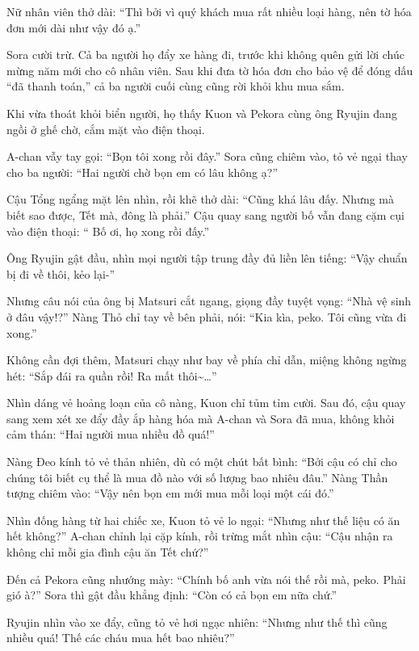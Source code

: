 \documentclass[../main.tex]{subfiles}
\begin{document}
Nữ nhân viên thở dài: ``Thì bởi vì quý khách mua rất nhiều loại hàng, nên tờ hóa đơn mới dài như vậy đó ạ.''

Sora cười trừ. Cả ba người họ đẩy xe hàng đi, trước khi không quên gửi lời chúc mừng năm mới cho cô nhân viên. Sau khi đưa tờ hóa đơn cho bảo vệ để đóng dấu ``đã thanh toán,'' cả ba người cuối cùng cũng rời khỏi khu mua sắm.

Khi vừa thoát khỏi biển người, họ thấy Kuon và Pekora cùng ông Ryujin đang ngồi ở ghế chờ, cắm mặt vào điện thoại.

A-chan vẫy tay gọi: ``Bọn tôi xong rồi đây.'' Sora cũng chiêm vào, tỏ vẻ ngại thay cho ba người: ``Hai người chờ bọn em có lâu không ạ?''

Cậu Tổng ngẩng mặt lên nhìn, rồi khẽ thở dài: ``Cũng khá lâu đấy. Nhưng mà biết sao được, Tết mà, đông là phải.'' Cậu quay sang người bố vẫn đang cặm cụi vào điện thoại: ``{\color{red} Bố ơi, họ xong rồi đấy.}''

Ông Ryujin gật đầu, nhìn mọi người tập trung đầy đủ liền lên tiếng: ``Vậy chuẩn bị đi về thôi, kẻo lại-''

Nhưng câu nói của ông bị Matsuri cắt ngang, giọng đầy tuyệt vọng: ``Nhà vệ sinh ở đâu vậy!?'' Nàng Thỏ chỉ tay về bên phải, nói: ``Kia kìa, peko. Tôi cũng vừa đi xong.''

Không cần đợi thêm, Matsuri chạy như bay về phía chỉ dẫn, miệng không ngừng hét: ``Sắp đái ra quần rồi! Ra mất thôi\~{}\dots''

Nhìn dáng vẻ hoảng loạn của cô nàng, Kuon chỉ tủm tỉm cười. Sau đó, cậu quay sang xem xét xe đẩy đầy ắp hàng hóa mà A-chan và Sora đã mua, không khỏi cảm thán: ``Hai người mua nhiều đồ quá!''

Nàng Đeo kính tỏ vẻ thản nhiên, dù có một chút bất bình: ``Bởi cậu có chỉ cho chúng tôi biết cụ thể là mua đồ nào với số lượng bao nhiêu đâu.'' Nàng Thần tượng chiêm vào: ``Vậy nên bọn em mới mua mỗi loại một cái đó.''

Nhìn đống hàng từ hai chiếc xe, Kuon tỏ vẻ lo ngại: ``Nhưng như thế liệu có ăn hết không?'' A-chan chỉnh lại cặp kính, rồi trừng mắt nhìn cậu: ``Cậu nhận ra không chỉ mỗi gia đình cậu ăn Tết chứ?''

Đến cả Pekora cũng nhướng mày: ``Chính bố anh vừa nói thế rồi mà, peko. Phải gió à?'' Sora thì gật đầu khẳng định: ``Còn có cả bọn em nữa chứ.''

Ryujin nhìn vào xe đẩy, cũng tỏ vẻ hơi ngạc nhiên: ``Nhưng như thế thì cũng nhiều quá! Thế các cháu mua hết bao nhiêu?''
\end{document}
